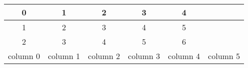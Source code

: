 \documentclass[12pt]{article}
\begin{document}
 
\begin{tabular}{ |c|c|c|c|c|c| } 
\hline 
0 & 1 & 2 & 3 & 4 \\
\hline 
1 & 2 & 3 & 4 & 5 \\
\hline 
2 & 3 & 4 & 5 & 6 \\
\hline 
column 0 & column 1 & column 2 & column 3 & column 4 & column 5 \\
\hline 
\end{tabular}
\end{document}

